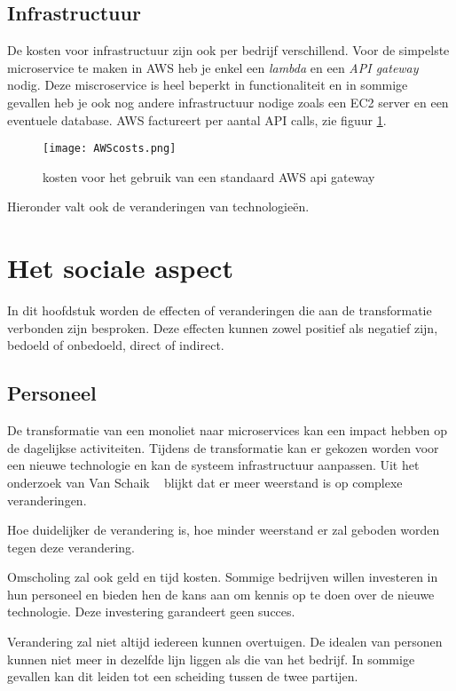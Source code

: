 \subsection{Infrastructuur}

De kosten voor infrastructuur zijn ook per bedrijf verschillend. Voor de simpelste microservice te maken in AWS heb je enkel een \emph{lambda} en een \emph{API gateway} nodig. Deze miscroservice is heel beperkt in functionaliteit en in sommige gevallen heb je ook nog andere infrastructuur nodige zoals een EC2 server en een eventuele database. AWS factureert per aantal API calls, zie figuur \ref{awscost}.

\begin{figure}[!htb]
     \centering
    \texttt{[image: AWScosts.png]}    
    \caption{kosten voor het gebruik van een standaard AWS api gateway \label{awscost}}
\end{figure}

Hieronder valt ook de veranderingen van technologieën.

\section{Het sociale aspect}

In dit hoofdstuk worden de effecten of veranderingen die aan de transformatie verbonden zijn besproken. Deze effecten kunnen zowel positief als negatief zijn, bedoeld of onbedoeld, direct of indirect.

\subsection{Personeel}

De transformatie van een monoliet naar microservices kan een impact hebben op de dagelijkse activiteiten. Tijdens de transformatie kan er gekozen worden voor een nieuwe technologie en kan de systeem infrastructuur aanpassen. Uit het onderzoek van Van Schaik ~\autocite{Schaik2014} blijkt dat er meer weerstand is op complexe veranderingen.  

Hoe duidelijker de verandering is, hoe minder weerstand er zal geboden worden tegen deze verandering.

Omscholing zal ook geld en tijd kosten. Sommige bedrijven willen investeren in hun personeel en bieden hen de kans aan om kennis op te doen over de nieuwe technologie. Deze investering garandeert geen succes.

Verandering zal niet altijd iedereen kunnen overtuigen. De idealen van personen kunnen niet meer in dezelfde lijn liggen als die van het bedrijf. In sommige gevallen kan dit leiden tot een scheiding tussen de twee partijen.

